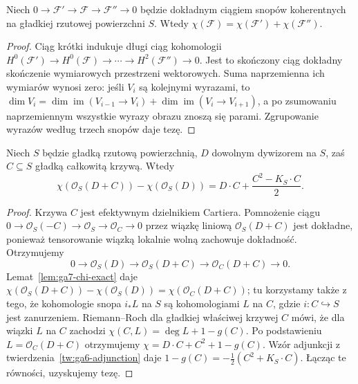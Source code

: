 \begin{lemat}
\label{lem:ga7-chi-exact}
Niech $0\to\mathcal F'\to\mathcal F\to\mathcal F''\to0$
będzie dokładnym ciągiem snopów koherentnych na
gładkiej rzutowej powierzchni $S$. Wtedy
$\chi(\mathcal F)=\chi(\mathcal F')+\chi(\mathcal F'')$.
\end{lemat}
\begin{proof}
Ciąg krótki indukuje długi ciąg kohomologii
$H^0(\mathcal F')\to H^0(\mathcal F)\to\cdots
\to H^2(\mathcal F'')\to0$.
Jest to skończony ciąg dokładny skończenie wymiarowych
przestrzeni wektorowych. Suma naprzemienna ich wymiarów
wynosi zero: jeśli $V_i$ są kolejnymi wyrazami, to
$\dim V_i=\dim\operatorname{im}(V_{i-1}\to V_i)+
\dim\operatorname{im}(V_i\to V_{i+1})$, a po zsumowaniu
naprzemiennym wszystkie wyrazy obrazu znoszą się parami.
Zgrupowanie wyrazów według trzech snopów daje tezę.
\end{proof}

\begin{lemat}
\label{lem:ga7-rr-increment}
Niech $S$ będzie gładką rzutową powierzchnią,
$D$ dowolnym dywizorem na $S$, zaś $C\subseteq S$
gładką całkowitą krzywą. Wtedy
\[
\chi(\mathcal O_S(D+C))-\chi(\mathcal O_S(D))
= D\cdot C+\frac{C^2-K_S\cdot C}{2}.
\]
\end{lemat}
\begin{proof}
Krzywa $C$ jest efektywnym dzielnikiem Cartiera.
Pomnożenie ciągu
$0\to\mathcal O_S(-C)\to\mathcal O_S\to\mathcal O_C\to0$
przez wiązkę liniową $\mathcal O_S(D+C)$ jest dokładne,
ponieważ tensorowanie wiązką lokalnie wolną zachowuje
dokładność. Otrzymujemy
\[
0\longrightarrow\mathcal O_S(D)
\longrightarrow\mathcal O_S(D+C)
\longrightarrow\mathcal O_C(D+C)\longrightarrow0.
\]
Lemat~\ref{lem:ga7-chi-exact} daje
$\chi(\mathcal O_S(D+C))-\chi(\mathcal O_S(D))
=\chi(\mathcal O_C(D+C))$; tu korzystamy także z tego,
że kohomologie snopa $i_*L$ na $S$ są kohomologiami
$L$ na $C$, gdzie $i:C\hookrightarrow S$ jest zanurzeniem.
Riemann--Roch dla gładkiej właściwej krzywej
$C$ mówi, że dla wiązki $L$ na $C$ zachodzi
$\chi(C,L)=\deg L+1-g(C)$. Po podstawieniu
$L=\mathcal O_C(D+C)$ otrzymujemy
$\chi= D\cdot C+C^2+1-g(C)$.
Wzór adjunkcji z twierdzenia~\ref{tw:ga6-adjunction}
daje $1-g(C)=-\frac12(C^2+K_S\cdot C)$.
Łącząc te równości, uzyskujemy tezę.
\end{proof}

